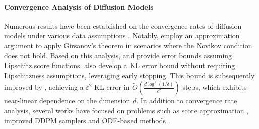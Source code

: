\paragraph{Convergence Analysis of Diffusion Models} %
Numerous results have been established on the convergence rates of diffusion models under various data assumptions \cite{manifold, lee2022polynomial}. 
Notably, \citet{chen2023ddpm} employ an approximation argument to apply Girsanov's theorem in scenarios where the Novikov condition does not hold. Based on this analysis, \citet{chen2023ddpm} and \citet{chen2023improved} provide error bounds assuming Lipschitz score functions. \citet{chen2023improved} also develop a KL error bound without requiring Lipschitzness assumptions, leveraging early stopping. This bound is subsequently improved by \citet{dlinear}, achieving a $\varepsilon^2$ KL error in $\tilde{O}\left(\frac{d\log^2(1/\delta)}{\varepsilon^2}\right)$ steps, which exhibits near-linear dependence on the dimension $d$. 
In addition to convergence rate analysis, several works have focused on problems such as score approximation \cite{chen2023score}, improved DDPM samplers \cite{liang2024broadeningtargetdistributionsaccelerated,li2024fasternonasymptoticconvergencediffusionbased,li2024acceleratingconvergencescorebaseddiffusion} and ODE-based methods \cite{pfprobably}. 

